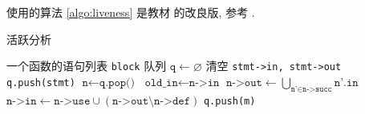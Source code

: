 \documentclass[11pt]{article}
\begin{document}
    使用的算法 \ref{algo:liveness} 是教材 \cite{compiler2009aho} 的改良版, 参考 \cite[第 397 页]{appel2004modern}.
    \begin{algorithm}[H]
        \small
        \caption{活跃分析}
        \label{algo:liveness}
        \begin{algorithmic}[1]
            \Require 一个函数的语句列表 \texttt{block}
            \State 队列 $\texttt{q} \gets \varnothing$
                \State 清空 \texttt{stmt->in, stmt->out}
                \State \texttt{q.push(stmt)}
            \EndFor
                \State $\texttt{n} \gets \texttt{q.pop()}$
                \State $\texttt{old\_in} \gets \texttt{n->in}$
                \State $\texttt{n->out} \gets \bigcup_{\texttt{n'} \in \texttt{n->succ}} \texttt{n'.in}$
                \State $\texttt{n->in} \gets \texttt{n->use} \cup (\texttt{n->out} \setminus \texttt{n->def})$
                        \State \texttt{q.push(m)}
                    \EndFor
                \EndIf
            \EndWhile
        \end{algorithmic}
    \end{algorithm}

    \renewcommand{\em}{\itshape}
    \printbibliography[title={参考文献}]
\end{document}
